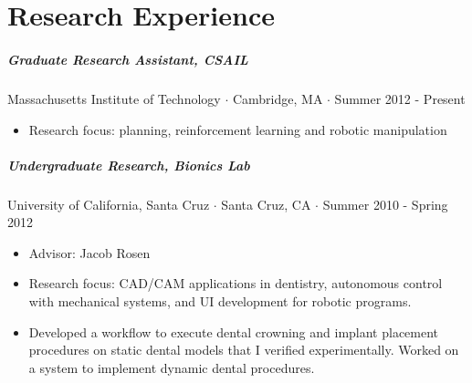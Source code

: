 \documentclass[10pt,letterpaper]{article}
\begin{document}
\section*{Research Experience}
\subparagraph{Graduate Research Assistant, CSAIL}
Massachusetts Institute of Technology $\cdot$ Cambridge, MA $\cdot$ Summer 2012 - Present
\begin{itemize}
	\item Research focus: planning, reinforcement learning and robotic manipulation
 \end{itemize}
 \subparagraph{Undergraduate Research, Bionics Lab}
University of California, Santa Cruz $\cdot$ Santa Cruz, CA $\cdot$ Summer 2010 - Spring 2012
\begin{itemize}
	\item Advisor: Jacob Rosen 
     	\item Research focus: CAD/CAM applications in dentistry, autonomous control with mechanical systems, and UI development for robotic programs.
     	\item  Developed a workflow to execute dental crowning and implant placement procedures on static dental models that I verified experimentally. Worked on a system to implement dynamic dental procedures. 
\end{itemize}
\end{document}
